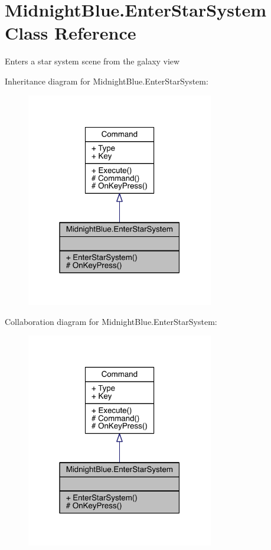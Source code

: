 \hypertarget{class_midnight_blue_1_1_enter_star_system}{}\section{Midnight\+Blue.\+Enter\+Star\+System Class Reference}
\label{class_midnight_blue_1_1_enter_star_system}


Enters a star system scene from the galaxy view  




Inheritance diagram for Midnight\+Blue.\+Enter\+Star\+System\+:
\nopagebreak
\begin{figure}[H]
\begin{center}
\leavevmode
\includegraphics[width=232pt]{class_midnight_blue_1_1_enter_star_system__inherit__graph}
\end{center}
\end{figure}


Collaboration diagram for Midnight\+Blue.\+Enter\+Star\+System\+:
\nopagebreak
\begin{figure}[H]
\begin{center}
\leavevmode
\includegraphics[width=232pt]{class_midnight_blue_1_1_enter_star_system__coll__graph}
\end{center}
\end{figure}
